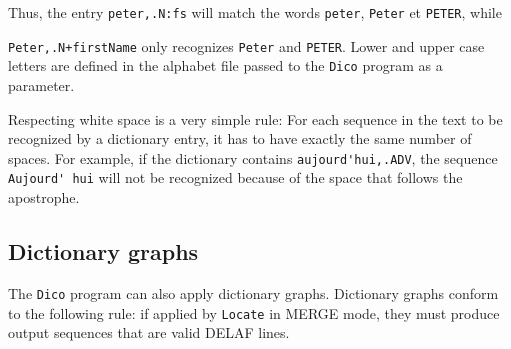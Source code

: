 \bigskip
\noindent Thus, the entry \verb$peter,.N:fs$ will match the words \verb+peter+,
\verb+Peter+ et \verb+PETER+, while

\noindent \verb$Peter,.N+firstName$ only 
recognizes \verb+Peter+ and \verb+PETER+. Lower and upper case
letters are defined in the alphabet file passed to the \verb+Dico+ program
 as a parameter.

\bigskip
\noindent Respecting white space is a very simple rule: For each sequence in the text to be
recognized by a dictionary entry, it has to have exactly the same number of
spaces. For example, if the dictionary contains \verb+aujourd'hui,.ADV+, the
sequence \verb+Aujourd' hui+ will not be recognized because of the space that
follows the apostrophe.


\subsection{Dictionary graphs}
\label{section-dictionary-graphs}
The \verb+Dico+ program
can also apply dictionary graphs. Dictionary graphs conform to the following
rule: if applied by \verb+Locate+ in MERGE mode,
they must produce output sequences that are valid DELAF lines.

